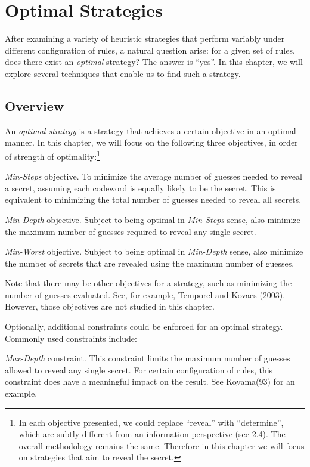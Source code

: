 \chapter{Optimal Strategies}

After examining a variety of heuristic strategies that perform variably under different configuration of rules, a natural question arise: for a given set of rules, does there exist an \emph{optimal} strategy? The answer is ``yes''. In this chapter, we will explore several techniques that enable us to find such a strategy.

\section{Overview}

An \emph{optimal strategy} is a strategy that achieves a certain objective in an optimal manner. In this chapter, we will focus on the following three objectives, in order of  strength of optimality:\footnote{In each objective presented, we could replace ``reveal'' with ``determine'', which are subtly different from an information perspective (see 2.4). The overall methodology remains the same. Therefore in this chapter we will focus on strategies that aim to reveal the secret.}

\emph{Min-Steps} objective. To minimize the average number of guesses needed to reveal a secret, assuming each codeword is equally likely to be the secret. This is equivalent to minimizing the total number of guesses needed to reveal all secrets.

\emph{Min-Depth} objective. Subject to being optimal in \emph{Min-Steps} sense, also minimize the maximum number of guesses required to reveal any single secret.

\emph{Min-Worst} objective. Subject to being optimal in \emph{Min-Depth} sense, also minimize the number of secrets that are revealed using the maximum number of guesses.

Note that there may be other objectives for a strategy, such as minimizing the number of guesses evaluated. See, for example, Temporel and Kovacs (2003). However, those objectives are not studied in this chapter.

Optionally, additional constraints could be enforced for an optimal strategy. Commonly used constraints include:

\emph{Max-Depth} constraint. This constraint limits the maximum number of guesses allowed to reveal any single secret. For certain configuration of rules, this constraint does have a meaningful impact on the result. See Koyama(93) for an example.

